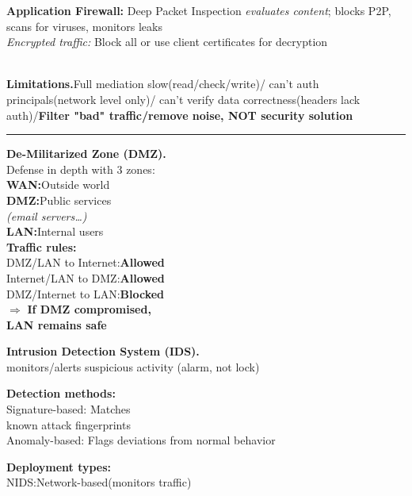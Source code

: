 \documentclass[9pt, a4paper]{extarticle}
\makeatletter
\renewcommand{\hline}{\noalign{\vskip 2px}\hrule\@height\arrayrulewidth\@width\linewidth\noalign{\vskip 2px}}
\makeatother
\begin{document}
\begin{minipage}[t]{0.495\textwidth}
\begin{minipage}[t]{0.32\textwidth}
	\end{minipage}\hfill
	\begin{minipage}[t]{0.33\textwidth}
		\textbf{Application Firewall:} Deep Packet Inspection \textit{evaluates content}; blocks P2P, scans for viruses, monitors leaks\\
		\textit{Encrypted traffic:} Block all or use client certificates for decryption
	\end{minipage}\\
	\textbf{Limitations.}Full mediation slow(read/check/write)/ can't auth principals(network level only)/ can't verify data correctness(headers lack auth)/\textbf{Filter "bad" traffic/remove noise, NOT security solution}\hline
	\begin{minipage}[t]{0.31\textwidth}
		\textbf{De-Militarized Zone (DMZ).} \\
		Defense in depth with 3 zones:\\
		\textbf{WAN:}Outside world\\
		\textbf{DMZ:}Public services\\\textit{(email servers\dots)}\\
		\textbf{LAN:}Internal users\\
		\textbf{Traffic rules:}\\
		DMZ/LAN to Internet:\textbf{Allowed}\\
		Internet/LAN to DMZ:\textbf{Allowed}\\
		DMZ/Internet to LAN:\textbf{Blocked}\\
		$\Rightarrow$ \textbf{If DMZ compromised, \\LAN remains safe}
	\end{minipage}\vline
	\begin{minipage}[t]{0.69\textwidth}
		\textbf{Intrusion Detection System (IDS).}\\
		monitors/alerts suspicious activity (alarm, not lock)\\
		\begin{minipage}[htp]{0.495\textwidth}
			\textbf{Detection methods:}\\
			Signature-based: Matches \\known attack fingerprints\\
			Anomaly-based: Flags deviations from normal behavior
		\end{minipage}\hfill\vline\hfill
		\begin{minipage}[htp]{0.495\textwidth}
			\textbf{Deployment types:}\\
			NIDS:Network-based(monitors traffic)\\

\end{minipage}
\end{minipage}
\end{minipage}
\end{document}
